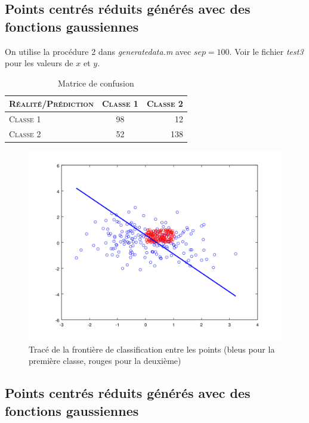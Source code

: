 \documentclass{article}
\begin{document}
\subsection{Points centrés réduits générés avec des fonctions gaussiennes}

On utilise la procédure 2 dans \emph{generatedata.m} avec $sep=100$. Voir le fichier \emph{test3} pour les valeurs de $x$ et $y$.

     \begin{table}[H]
       \caption{Matrice de confusion}
       \begin{tabular}{|l|c|r|}
         \hline
         \textsc{Réalité/Prédiction} & \textsc{Classe 1} & \textsc{Classe 2}\\
         \hline
         \textsc{Classe 1} & 98 & 12\\
         \hline
         \textsc{Classe 2} & 52 & 138\\
         \hline
       \end{tabular}
     \end{table}

         \begin{figure}
           \begin{center}
             \subfigure\includegraphics[scale=0.3]{images/line2D3.png}
             \caption{Tracé de la frontière de classification entre les points (bleus pour la première classe, rouges pour la deuxième)}
           \end{center}
         \end{figure}

\subsection{Points centrés réduits générés avec des fonctions gaussiennes}
\end{document}
